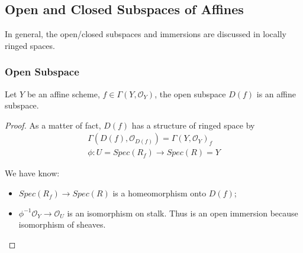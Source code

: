 \documentclass[Total.tex]{subfiles}
\begin{document}
			\subsection{Open and Closed Subspaces of Affines}
			
			In general, the open/closed subspaces and immersions are discussed in locally ringed spaces.
			
			\subsubsection{Open Subspace}
				\begin{lemma}
				Let $Y$ be an affine scheme, $f\in \Gamma(Y,\mathcal{O}_Y)$, the open subspace $D(f)$ is an affine subspace. 
			\end{lemma}
			\begin{proof}
				As a matter of fact, $D(f)$ has a structure of ringed space by
				\begin{gather*}
					\Gamma(D(f),\mathcal{O}_{D(f)})=\Gamma(Y,\mathcal{O}_Y)_f\\
					\phi:U=Spec(R_f)\rightarrow Spec(R)=Y
				\end{gather*}
				
				We have know:
				\begin{itemize}
					\item $Spec(R_f)\rightarrow Spec(R)$ is a homeomorphism onto $D(f)$;
					\item $\phi^{-1}\mathcal{O}_Y\rightarrow \mathcal{O}_U$ is an isomorphism on stalk. Thus is an open immersion because isomorphism of sheaves.
				\end{itemize}
			\end{proof}
\end{document}
